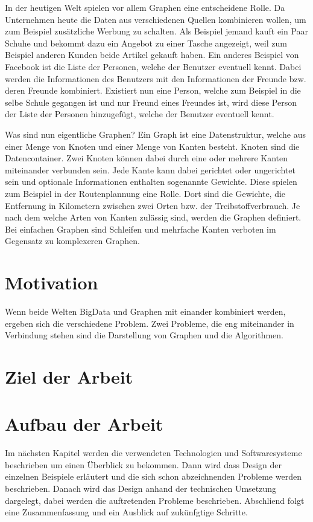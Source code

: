 In der heutigen Welt spielen vor allem Graphen eine entscheidene Rolle. Da 
Unternehmen heute die Daten aus verschiedenen Quellen kombinieren wollen, um zum
Beispiel zusätzliche Werbung zu schalten. Als Beispiel jemand kauft ein Paar
Schuhe und bekommt dazu ein Angebot zu einer Tasche angezeigt, weil zum
Beispiel anderen Kunden beide Artikel gekauft haben. Ein anderes Beispiel von
Facebook ist die Liste der Personen, welche der Benutzer eventuell kennt.
Dabei werden die Informationen des Benutzers mit den Informationen der Freunde
bzw. deren Freunde kombiniert. Existiert nun eine Person, welche zum Beispiel
in die selbe Schule gegangen ist und nur Freund eines Freundes ist, wird diese
Person der Liste der Personen hinzugefügt, welche der Benutzer eventuell kennt.

Was sind nun eigentliche Graphen? Ein Graph ist eine Datenstruktur, welche aus
einer Menge von Knoten und einer Menge von Kanten besteht. Knoten sind die
Datencontainer. Zwei Knoten können dabei durch eine oder mehrere Kanten miteinander
verbunden sein. Jede Kante kann dabei gerichtet oder ungerichtet sein und
optionale Informationen enthalten sogenannte Gewichte. Diese spielen zum Beispiel
in der Routenplannung eine Rolle. Dort sind die Gewichte, die Entfernung in
Kilometern zwischen zwei Orten bzw. der Treibstoffverbrauch. Je nach dem welche
Arten von Kanten zulässig sind, werden die Graphen definiert. Bei einfachen
Graphen sind Schleifen und mehrfache Kanten verboten im Gegensatz zu komplexeren
Graphen.

\section{Motivation}
Wenn beide Welten BigData und Graphen mit einander kombiniert werden, ergeben
sich die verschiedene Problem. Zwei Probleme, die eng miteinander in Verbindung
stehen sind die Darstellung von Graphen und die Algorithmen.


\section{Ziel der Arbeit}

\section{Aufbau der Arbeit}
Im nächsten Kapitel werden die verwendeten Technologien und Softwaresysteme
beschrieben um einen Überblick zu bekommen. Dann wird dass Design der einzelnen
Beispiele erläutert und die sich schon abzeichnenden Probleme werden beschrieben.
Danach wird das Design anhand der technischen Umsetzung dargelegt, dabei werden
die auftretenden Probleme beschrieben. Abschliend folgt eine Zusammenfassung und
ein Ausblick auf zukünfgtige Schritte.
